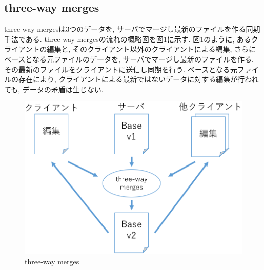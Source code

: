 \subsection{three-way merges}
three-way merges\cite{THREE}は3つのデータを, サーバでマージし最新のファイルを作る同期手法である. three-way mergesの流れの概略図を図\ref{threeway}に示す. 図\ref{threeway}のように, あるクライアントの編集と, そのクライアント以外のクライアントによる編集, さらにベースとなる元ファイルのデータを, サーバでマージし最新のファイルを作る. その最新のファイルをクライアントに送信し同期を行う. ベースとなる元ファイルの存在により, クライアントによる最新ではないデータに対する編集が行われても, データの矛盾は生じない.
\begin{figure}[]
  \begin{center}
    \includegraphics[scale=0.3]{images/threeway}
    \caption{three-way merges}
    \label{threeway}
  \end{center}
\end{figure}
%
